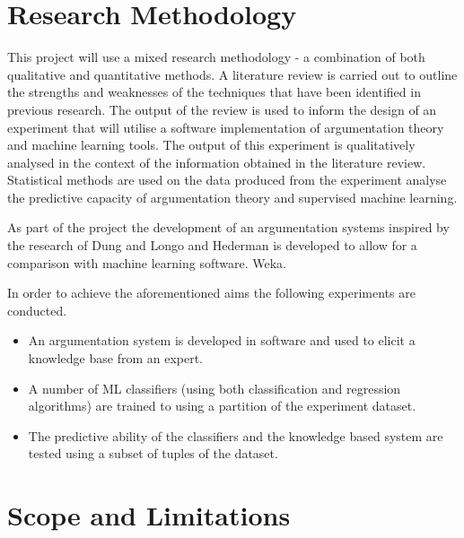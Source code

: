 
\section{Research Methodology}


This project will use a mixed research methodology - a combination of both qualitative and quantitative methods. A literature review is carried out to outline the strengths and weaknesses of the techniques that have been identified in previous research. The output of the review is used to inform the design of an experiment that will utilise a software implementation of argumentation theory and machine learning tools. The output of this experiment is qualitatively analysed in the context of the information obtained in the literature review. Statistical methods are used on the data produced from the experiment analyse the predictive capacity of argumentation theory and supervised machine learning. 

As part of the project the development of an argumentation systems inspired by the research of Dung and Longo and Hederman is developed to allow for a comparison with machine learning software. Weka. 


In order to achieve the aforementioned aims the following experiments are conducted.

\begin{itemize}

  \item An argumentation system is developed in software and used to elicit a knowledge base from an expert.
  \item A number of ML classifiers (using both classification and regression algorithms) are trained to using a partition of the experiment dataset.
  \item The predictive ability of the classifiers and the knowledge based system are tested using a subset of tuples of the dataset.

\end{itemize}



\section{Scope and Limitations}


